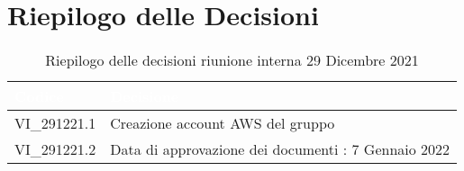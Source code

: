 \section{Riepilogo delle Decisioni}


\begin{table}[!htbp]
\renewcommand{\arraystretch}{1.5}
\begin{tabular}{m{}<{\centering}  m{}<{\centering}}
\rowcolor{darkblue} \textcolor{white}{\textbf{Codice}} & \textcolor{white}{\textbf{Decisione}} \\
\hline
VI\_291221.1 & Creazione account AWS del gruppo\\
\rowcolor{gray!10} VI\_291221.2 & Data di approvazione dei documenti : 7 Gennaio 2022\\
\end{tabular}
\caption{Riepilogo delle decisioni riunione interna 29 Dicembre 2021}
\end{table}